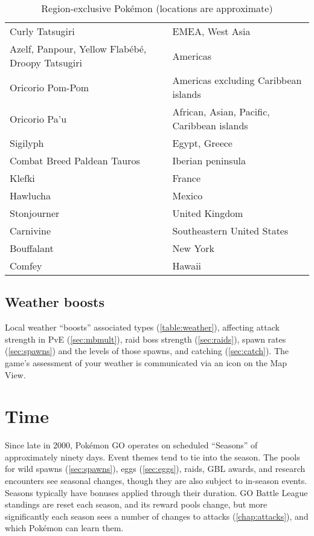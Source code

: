 \begin{table}
\begin{tabular}{p{}l}
Curly Tatsugiri & EMEA, West Asia\\
\rowcolor{Gray!25}
Azelf, Panpour, Yellow Flabébé, Droopy Tatsugiri & Americas\\
Oricorio Pom-Pom & Americas excluding Caribbean islands\\
\rowcolor{Gray!25}
Oricorio Pa'u & African, Asian, Pacific, Caribbean islands\\
Sigilyph & Egypt, Greece\\
\rowcolor{Gray!25}
Combat Breed Paldean Tauros & Iberian peninsula\\
Klefki & France\\
\rowcolor{Gray!25}
Hawlucha & Mexico\\
Stonjourner & United Kingdom\\
\rowcolor{Gray!25}
Carnivine & Southeastern United States\\
Bouffalant & New York\\
\rowcolor{Gray!25}
Comfey & Hawaii\\
\end{tabular}
\caption{Region-exclusive Pokémon (locations are approximate)\label{table:regional}}
\end{table}
\subsection{Weather boosts\label{sec:weather}}
Local weather ``boosts'' associated types (\autoref{table:weather}),
  affecting attack strength in PvE (\autoref{sec:mbmult}),
  raid boss strength (\autoref{sec:raids}),
  spawn rates (\autoref{sec:spawns}) and the levels of those spawns,
  and catching (\autoref{sec:catch}).
The game's assessment of your weather is communicated via an icon on the Map View.
\begin{table}

\end{table}
\section{Time\label{sec:timeline}}
Since late in 2000, Pokémon GO operates on scheduled ``Seasons'' of approximately ninety days.
Event themes tend to tie into the season.
The pools for wild spawns (\autoref{sec:spawns}), eggs (\autoref{sec:eggs}), raids, GBL awards,
 and research encounters see seasonal changes, though they are also subject to in-season events.
Seasons typically have bonuses applied through their duration.
GO Battle League standings are reset each season, and its reward pools change, but
 more significantly each season sees a number of changes to attacks (\autoref{chap:attacks}),
 and which Pokémon can learn them.

